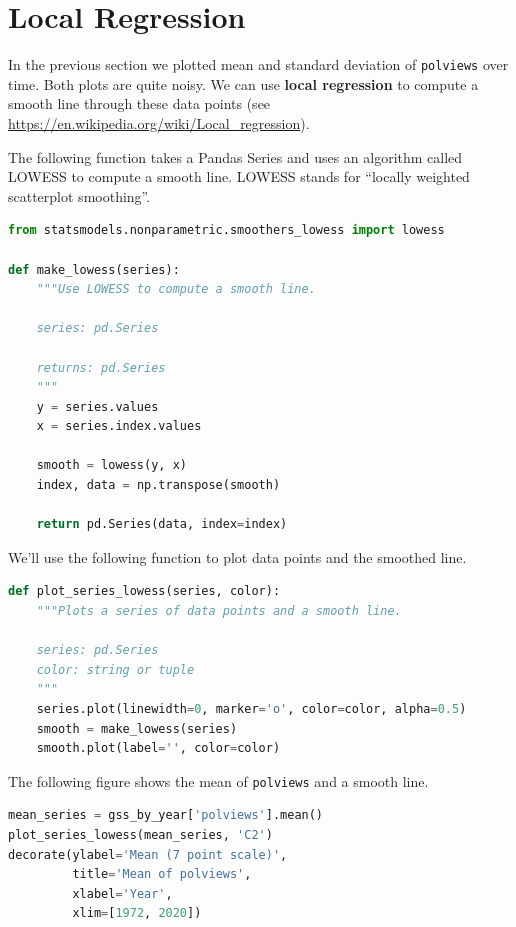 \hypertarget{local-regression}{%
\section{Local Regression}\label{local-regression}}

In the previous section we plotted mean and standard deviation of
\passthrough{\lstinline!polviews!} over time. Both plots are quite
noisy. We can use \textbf{local regression} to compute a smooth line
through these data points (see
\url{https://en.wikipedia.org/wiki/Local_regression}).

The following function takes a Pandas Series and uses an algorithm
called LOWESS to compute a smooth line. LOWESS stands for ``locally
weighted scatterplot smoothing''.

\begin{lstlisting}[language=Python]
from statsmodels.nonparametric.smoothers_lowess import lowess

def make_lowess(series):
    """Use LOWESS to compute a smooth line.
    
    series: pd.Series
    
    returns: pd.Series
    """
    y = series.values
    x = series.index.values

    smooth = lowess(y, x)
    index, data = np.transpose(smooth)

    return pd.Series(data, index=index) 
\end{lstlisting}

We'll use the following function to plot data points and the smoothed
line.

\begin{lstlisting}[language=Python]
def plot_series_lowess(series, color):
    """Plots a series of data points and a smooth line.
    
    series: pd.Series
    color: string or tuple
    """
    series.plot(linewidth=0, marker='o', color=color, alpha=0.5)
    smooth = make_lowess(series)
    smooth.plot(label='', color=color)
\end{lstlisting}

The following figure shows the mean of
\passthrough{\lstinline!polviews!} and a smooth line.

\begin{lstlisting}[language=Python]
mean_series = gss_by_year['polviews'].mean()
plot_series_lowess(mean_series, 'C2')
decorate(ylabel='Mean (7 point scale)',
         title='Mean of polviews',
         xlabel='Year',
         xlim=[1972, 2020])
\end{lstlisting}

